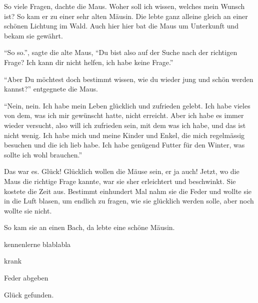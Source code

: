 So viele Fragen, dachte die Maus. Woher soll ich wissen, welches mein Wunsch ist? So kam er zu einer sehr alten Mäusin. Die lebte ganz alleine gleich an einer schönen Lichtung im Wald. Auch hier hier bat die Maus um Unterkunft und bekam sie gewährt. 

\enquote{So so.}, sagte die alte Maus, \enquote{Du bist also auf der Suche nach der richtigen Frage? Ich kann dir nicht helfen, ich habe keine Frage.} 

\enquote{Aber Du möchtest doch bestimmt wissen, wie du wieder jung und schön werden kannst?} entgegnete die Maus.

\enquote{Nein, nein. Ich habe mein Leben glücklich und zufrieden gelebt. Ich habe vieles von dem, was ich mir gewünscht hatte, nicht erreicht. Aber ich habe es immer wieder versucht, also will ich zufrieden sein, mit dem was ich habe, und das ist nicht wenig. Ich habe mich und meine Kinder und Enkel, die mich regelmässig besuchen und die ich lieb habe. Ich habe genügend Futter für den Winter, was sollte ich wohl brauchen.}

Das war es. Glück! Glücklich wollen die Mäuse sein, er ja auch! Jetzt, wo die Maus die richtige Frage kannte, war sie sher erleichtert und beschwinkt. Sie kostete die Zeit aus. Bestimmt einhundert Mal nahm sie die Feder und wollte sie in die Luft blasen, um endlich zu fragen, wie sie glücklich werden solle, aber noch wollte sie nicht.

So kam sie an einen Bach, da lebte eine schöne Mäusin. 

kennenlerne blablabla

krank

Feder abgeben

Glück gefunden.

